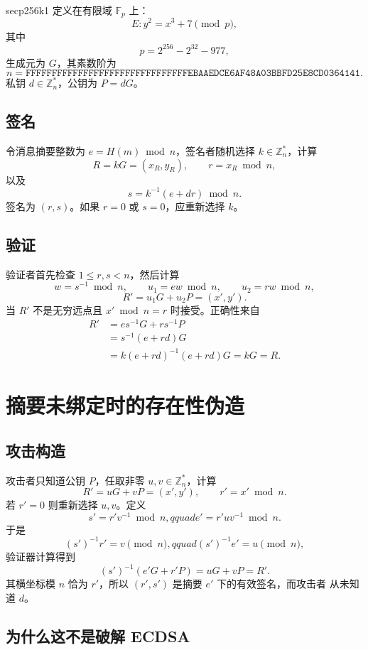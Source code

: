 \documentclass[UTF8,a4paper,12pt]{ctexart}
\begin{document}
secp256k1 定义在有限域 $\mathbb F_p$ 上：
\[
  E: y^2=x^3+7\pmod p,
\]
其中
\[
 p=2^{256}-2^{32}-977,
\]
生成元为 $G$，其素数阶为
\[
 n=\mathtt{FFFFFFFFFFFFFFFFFFFFFFFFFFFFFFFEBAAEDCE6AF48A03BBFD25E8CD0364141}.
\]
私钥 $d\in\mathbb Z_n^*$，公钥为 $P=dG$。

\subsection{签名}

令消息摘要整数为 $e=H(m)\bmod n$，签名者随机选择
$k\in\mathbb Z_n^*$，计算
\[
 R=kG=(x_R,y_R),\qquad r=x_R\bmod n,
\]
以及
\[
 s=k^{-1}(e+dr)\bmod n.
\]
签名为 $(r,s)$。如果 $r=0$ 或 $s=0$，应重新选择 $k$。

\subsection{验证}

验证者首先检查 $1\le r,s<n$，然后计算
\[
 w=s^{-1}\bmod n,\qquad u_1=ew\bmod n,\qquad u_2=rw\bmod n,
\]
\[
 R'=u_1G+u_2P=(x',y').
\]
当 $R'$ 不是无穷远点且 $x'\bmod n=r$ 时接受。正确性来自
\[
\begin{aligned}
R'&=es^{-1}G+rs^{-1}P\\
  &=s^{-1}(e+rd)G\\
  &=k(e+rd)^{-1}(e+rd)G=kG=R.
\end{aligned}
\]

\section{摘要未绑定时的存在性伪造}

\subsection{攻击构造}

攻击者只知道公钥 $P$，任取非零 $u,v\in\mathbb Z_n^*$，计算
\[
 R'=uG+vP=(x',y'),\qquad r'=x'\bmod n.
\]
若 $r'=0$ 则重新选择 $u,v$。定义
\[
 s'=r'v^{-1}\bmod n,qquad e'=r'uv^{-1}\bmod n.
\]
于是
\[
 (s')^{-1}r'=v\pmod n,qquad (s')^{-1}e'=u\pmod n,
\]
验证器计算得到
\[
(s')^{-1}(e'G+r'P)=uG+vP=R'.
\]
其横坐标模 $n$ 恰为 $r'$，所以 $(r',s')$ 是摘要 $e'$ 下的有效签名，而攻击者
从未知道 $d$。

\subsection{为什么这不是破解 ECDSA}
\end{document}
